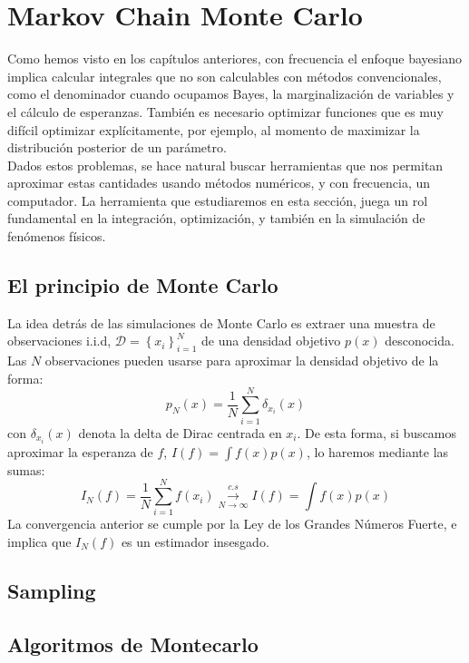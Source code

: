 \chapter{Markov Chain Monte Carlo}

Como hemos visto en los capítulos anteriores, con frecuencia el enfoque bayesiano implica calcular integrales que no son calculables con métodos convencionales, como el denominador cuando ocupamos Bayes, la marginalización de variables y el cálculo de esperanzas. También es necesario optimizar funciones que es muy difícil optimizar explícitamente, por ejemplo, al momento de maximizar la distribución posterior de un parámetro.  \\
Dados estos problemas, se hace natural buscar herramientas que nos permitan aproximar estas cantidades usando métodos numéricos, y con frecuencia, un computador. La herramienta que estudiaremos en esta sección, juega un rol fundamental en la integración, optimización, y también en la simulación de fenómenos físicos. 


\section{El principio de Monte Carlo}

La idea detrás de las simulaciones de Monte Carlo es extraer una muestra de observaciones i.i.d, $\mathcal{D}=\left \{ x_i \right \}_{i=1}^{N}$ de una densidad objetivo $p(x)$ desconocida. Las $N$ observaciones pueden usarse para aproximar la densidad objetivo de la forma: 
$$
p_{N}(x)=\dfrac{1}{N} \sum_{i=1}^{N} \delta_{x_i}(x)
$$
con $\delta_{x_i}(x)$ denota la delta de Dirac centrada en $x_i$. De esta forma, si buscamos aproximar la esperanza de $f$, $I(f)=\int f(x)p(x)$, lo haremos mediante las sumas: 
$$
I_{N}(f)= \dfrac{1}{N} \sum_{i=1}^{N}f(x_i) \overset{c.s}{ \underset{N \to \infty}{\rightarrow }} I(f)= \int f(x)p(x) 
$$
La convergencia anterior se cumple por la Ley de los Grandes Números Fuerte, e implica que $I_{N}(f)$ es un estimador insesgado. 

\section{Sampling}

\section{Algoritmos de Montecarlo}


